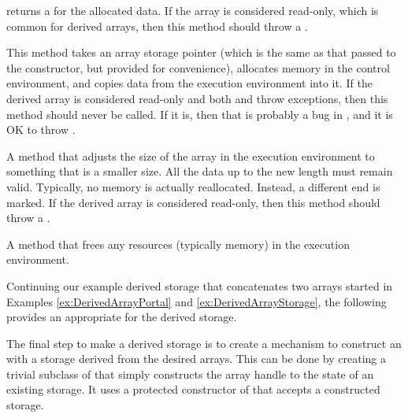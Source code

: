 \begin{description}
  returns a  for the allocated data. If the array
  is considered read-only, which is common for derived arrays, then this
  method should throw a .
\item[\textcode{RetrieveOutputData}] This method takes an array storage
  pointer (which is the same as that passed to the constructor, but
  provided for convenience), allocates memory in the control environment,
  and copies data from the execution environment into it. If the derived
  array is considered read-only and both  and
   throw exceptions, then this method should
  never be called. If it is, then that is probably a bug in
  , and it is OK to throw
  .
\item[\textcode{Shrink}] A method that adjusts the size of the array in the
  execution environment to something that is a smaller size. All the data
  up to the new length must remain valid. Typically, no memory is actually
  reallocated. Instead, a different end is marked. If the derived array is
  considered read-only, then this method should throw a
  .
\item[\textcode{ReleaseResources}] A method that frees any resources
  (typically memory) in the execution environment.
\end{description}

Continuing our example derived storage that concatenates two arrays
started in Examples \ref{ex:DerivedArrayPortal} and
\ref{ex:DerivedArrayStorage}, the following provides an
 appropriate for the derived storage.




The final step to make a derived storage is to create a mechanism to
construct an  with a storage derived from the
desired arrays. This can be done by creating a trivial subclass of
 that simply constructs the array handle to the state
of an existing storage. It uses a protected constructor of
 that accepts a constructed storage.


